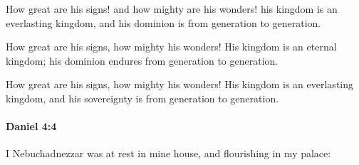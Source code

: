 			\begin{versebox}
					\item[BHS] 
					\item[ASV] How great are his signs! and how mighty are his wonders! his kingdom is an everlasting kingdom, and his dominion is from generation to generation.
					\item[NIV] How great are his signs, how mighty his wonders! His kingdom is an eternal kingdom; his dominion endures from generation to generation.
					\item[NRSV] How great are his signs, how mighty his wonders! His kingdom is an everlasting kingdom, and his sovereignty is from generation to generation.
			\end{versebox}

		\paragraph{Daniel 4:4} %
			\label{DANIEL-4-4}

			I Nebuchadnezzar was at rest in mine house, and flourishing in my palace:


